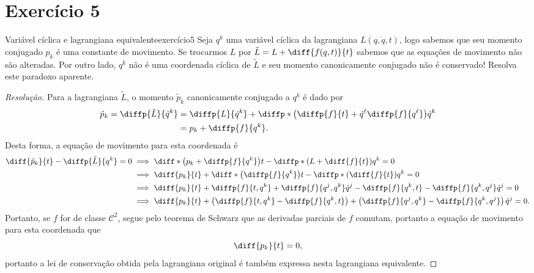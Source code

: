 \section*{Exercício 5}
\begin{exercício}{Variável cíclica e lagrangiana equivalente}{exercício5}
    Seja \(q^k\) uma variável cíclica da lagrangiana \(L(q,\dot{q}, t)\), logo sabemos que seu momento conjugado \(p_k\) é uma constante de movimento. Se trocarmos \(L\) por \(\tilde{L} = L + \diff{f(q,t)}{t}\) sabemos que as equações de movimento não são alteradas. Por outro lado, \(q^k\) não é uma coordenada cíclica de \(\tilde{L}\) e seu momento canonicamente conjugado não é conservado! Resolva este paradoxo aparente.
\end{exercício}
\begin{proof}[Resolução]
    Para a lagrangiana \(\tilde{L}\), o momento \(\tilde{p}_k\) canonicamente conjugado a \(q^k\) é dado por
    \begin{align*}
        \tilde{p}_k = \diffp{\tilde{L}}{\dot{q}^k} &= \diffp{L}{\dot{q}^k} + \diffp*{\left(\diffp{f}{t} + \dot{q}^\ell\diffp{f}{q^\ell}\right)}{\dot{q}^k}\\
                                                   &= p_k + \diffp{f}{q^k}.
    \end{align*}
    Desta forma, a equação de movimento para esta coordenada é
    \begin{align*}
        \diff{\tilde{p}_k}{t} - \diffp{\tilde{L}}{q^k} = 0 &\implies \diff*{\left(p_k + \diffp{f}{q^k}\right)}{t} - \diffp*{\left(L + \diff{f}{t}\right)}{q^k} = 0\\
                                                           &\implies \diff{p_k}{t} + \diff*{\left(\diffp{f}{q^k}\right)}{t} - \diffp*{\left(\diff{f}{t}\right)}{q^k} = 0\\
                                                           &\implies \diff{p_k}{t} + \diffp{f}{t,q^k} + \diffp{f}{q^j,q^k}\dot{q}^j - \diffp{f}{q^k,t} - \diffp{f}{q^k,q^j}\dot{q}^j = 0\\
                                                           &\implies \diff{p_k}{t} + \left(\diffp{f}{t,q^k} - \diffp{f}{q^k,t}\right) + \left(\diffp{f}{q^j,q^k} - \diffp{f}{q^k,q^j}\right)\dot{q}^j= 0.
    \end{align*}
    Portanto, se \(f\) for de classe \(\mathcal{C}^2\), segue pelo teorema de Schwarz que as derivadas parciais de \(f\) comutam, portanto a equação de movimento para esta coordenada que
    \begin{equation*}
        \diff{p_k}{t} = 0,
    \end{equation*}
    portanto a lei de conservação obtida pela lagrangiana original é também expressa nesta lagrangiana equivalente.
\end{proof}
